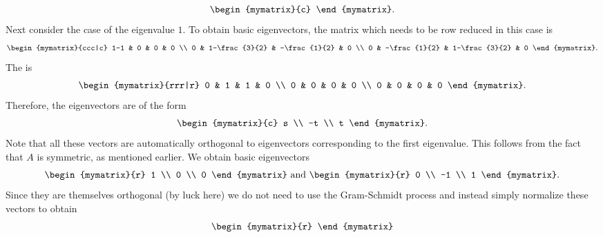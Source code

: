 \begin{solution}
\begin{equation*}
\begin{mymatrix}{c}
    \end{mymatrix}.
  \end{equation*}
  Next consider the case of the eigenvalue $1$. To obtain basic
  eigenvectors, the matrix which needs to be row reduced in this case
  is
  \begin{equation*}
    \def\arraystretch{1.2}
    \begin{mymatrix}{ccc|c}
      1-1 & 0 & 0 & 0 \\
      0 & 1-\frac{3}{2} & -\frac{1}{2} & 0 \\
      0 & -\frac{1}{2} & 1-\frac{3}{2} & 0
    \end{mymatrix}.
  \end{equation*}
  The {\rref} is
  \begin{equation*}
    \begin{mymatrix}{rrr|r}
      0 & 1 & 1 & 0 \\
      0 & 0 & 0 & 0 \\
      0 & 0 & 0 & 0
    \end{mymatrix}.
  \end{equation*}
  Therefore, the eigenvectors are of the form
  \begin{equation*}
    \begin{mymatrix}{c}
      s \\
      -t \\
      t
    \end{mymatrix}.
  \end{equation*}
  Note that all these vectors are automatically orthogonal to
  eigenvectors corresponding to the first eigenvalue. This follows
  from the fact that $A$ is symmetric, as mentioned earlier.
  We obtain basic eigenvectors
  \begin{equation*}
    \begin{mymatrix}{r}
      1 \\
      0 \\
      0
    \end{mymatrix} \text{ and }\begin{mymatrix}{r}
      0 \\
      -1 \\
      1
    \end{mymatrix}.
  \end{equation*}
  Since they are themselves orthogonal (by luck here) we do not need
  to use the Gram-Schmidt process and instead simply normalize these
  vectors to obtain
  \begin{equation*}
    \def\arraystretch{1.2}
    \begin{mymatrix}{r}

\end{mymatrix}
\end{equation*}
\end{solution}
